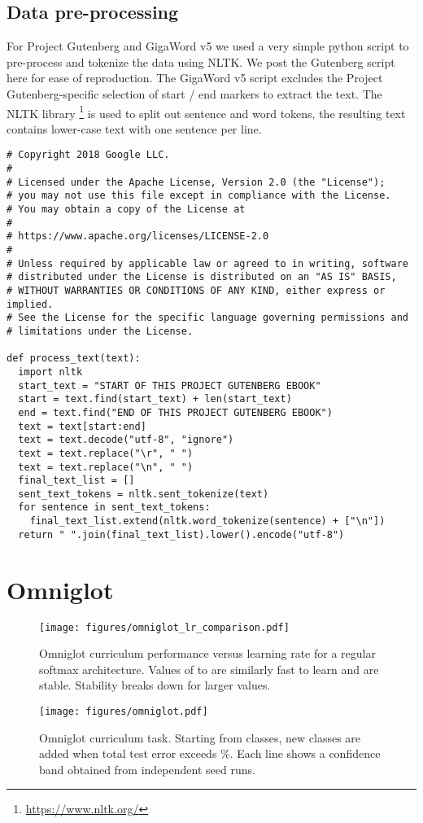\documentclass{article} \usepackage{hyperref}
\def\r{\mathbf{r}}
\begin{document}
\newpage

\subsection{Data pre-processing}
\label{appendix:preprocess}
For Project Gutenberg and GigaWord v5 we used a very simple python script to pre-process and tokenize the data using NLTK. We post the Gutenberg script here for ease of reproduction. The GigaWord v5 script excludes the Project Gutenberg-specific selection of start / end markers to extract the text. The NLTK library \footnote{\url{https://www.nltk.org/}} is used to split out sentence and word tokens, the resulting text contains lower-case text with one sentence per line.
\begin{small}
\begin{verbatim}
# Copyright 2018 Google LLC.
#
# Licensed under the Apache License, Version 2.0 (the "License");
# you may not use this file except in compliance with the License.
# You may obtain a copy of the License at
#
# https://www.apache.org/licenses/LICENSE-2.0
#
# Unless required by applicable law or agreed to in writing, software
# distributed under the License is distributed on an "AS IS" BASIS,
# WITHOUT WARRANTIES OR CONDITIONS OF ANY KIND, either express or implied.
# See the License for the specific language governing permissions and
# limitations under the License.

def process_text(text):
  import nltk
  start_text = "START OF THIS PROJECT GUTENBERG EBOOK"
  start = text.find(start_text) + len(start_text)
  end = text.find("END OF THIS PROJECT GUTENBERG EBOOK")
  text = text[start:end]
  text = text.decode("utf-8", "ignore")
  text = text.replace("\r", " ")
  text = text.replace("\n", " ")
  final_text_list = []
  sent_text_tokens = nltk.sent_tokenize(text)
  for sentence in sent_text_tokens:
    final_text_list.extend(nltk.word_tokenize(sentence) + ["\n"])
  return " ".join(final_text_list).lower().encode("utf-8")
\end{verbatim}
\end{small}

\newpage

\section{Omniglot}
\label{appendix:omniglot}
\begin{figure}[h!]
    \centering
    \texttt{[image: figures/omniglot\_lr\_comparison.pdf]}
    \caption{Omniglot curriculum performance versus learning rate for a regular softmax architecture. Values of  to  are similarly fast to learn and are stable. Stability breaks down for larger values.}
    \label{fig:omniglot_lr}
\end{figure}

\begin{figure}[h!]
    \centering
    \texttt{[image: figures/omniglot.pdf]}
    \caption{Omniglot curriculum task. Starting from  classes,  new classes are added when total test error exceeds \%. Each line shows a  confidence band obtained from  independent seed runs.}
    \label{fig:omniglot}
\end{figure}
\end{document}
